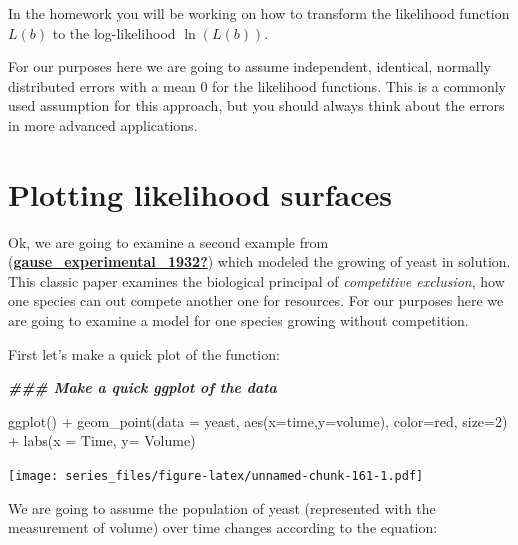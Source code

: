 \documentclass[
]{book}
\newenvironment{Shaded}{\begin{snugshade}}{\end{snugshade}}
\newcommand{\AttributeTok}[1]{\textcolor[rgb]{0.77,0.63,0.00}{#1}}
\newcommand{\DecValTok}[1]{\textcolor[rgb]{0.00,0.00,0.81}{#1}}
\newcommand{\DocumentationTok}[1]{\textcolor[rgb]{0.56,0.35,0.01}{\textbf{\textit{#1}}}}
\newcommand{\FunctionTok}[1]{\textcolor[rgb]{0.00,0.00,0.00}{#1}}
\newcommand{\NormalTok}[1]{#1}
\newcommand{\SpecialCharTok}[1]{\textcolor[rgb]{0.00,0.00,0.00}{#1}}
\newcommand{\StringTok}[1]{\textcolor[rgb]{0.31,0.60,0.02}{#1}}
\theoremstyle{definition}
\theoremstyle{definition}
\theoremstyle{definition}
\theoremstyle{remark}
\begin{document}
In the homework you will be working on how to transform the likelihood function \(L(b)\) to the log-likelihood \(\ln(L(b))\).

For our purposes here we are going to assume independent, identical, normally distributed errors with a mean 0 for the likelihood functions. This is a commonly used assumption for this approach, but you should always think about the errors in more advanced applications.

\hypertarget{plotting-likelihood-surfaces}{%
\section{Plotting likelihood surfaces}\label{plotting-likelihood-surfaces}}

Ok, we are going to examine a second example from (\protect\hyperlink{ref-gause_experimental_1932}{\textbf{gause\_experimental\_1932?}}) which modeled the growing of yeast in solution. This classic paper examines the biological principal of \emph{competitive exclusion}, how one species can out compete another one for resources. For our purposes here we are going to examine a model for one species growing without competition.

First let's make a quick plot of the function:

\begin{Shaded}
\begin{Highlighting}[]
\DocumentationTok{\#\#\# Make a quick ggplot of the data}

\FunctionTok{ggplot}\NormalTok{() }\SpecialCharTok{+}
  \FunctionTok{geom\_point}\NormalTok{(}\AttributeTok{data =}\NormalTok{ yeast,}
             \FunctionTok{aes}\NormalTok{(}\AttributeTok{x=}\NormalTok{time,}\AttributeTok{y=}\NormalTok{volume),}
             \AttributeTok{color=}\StringTok{\textquotesingle{}red\textquotesingle{}}\NormalTok{,}
             \AttributeTok{size=}\DecValTok{2}\NormalTok{) }\SpecialCharTok{+}
  \FunctionTok{labs}\NormalTok{(}\AttributeTok{x =} \StringTok{\textquotesingle{}Time\textquotesingle{}}\NormalTok{, }\AttributeTok{y=} \StringTok{\textquotesingle{}Volume\textquotesingle{}}\NormalTok{)}
\end{Highlighting}
\end{Shaded}

\texttt{[image: series\_files/figure-latex/unnamed-chunk-161-1.pdf]}

We are going to assume the population of yeast (represented with the measurement of volume) over time changes according to the equation:
\end{document}
